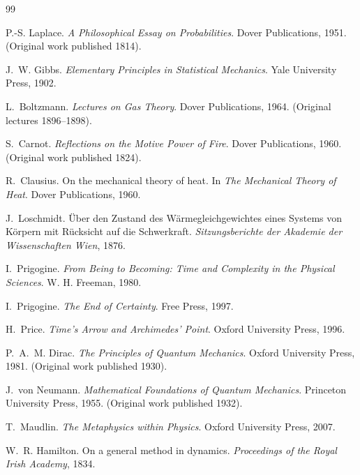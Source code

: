 \documentclass[11pt,oneside]{book}
\begin{document}
\begin{thebibliography}{99}

P.-S. Laplace.
\newblock \emph{A Philosophical Essay on Probabilities}.
\newblock Dover Publications, 1951.
\newblock (Original work published 1814).

J.~W. Gibbs.
\newblock \emph{Elementary Principles in Statistical Mechanics}.
\newblock Yale University Press, 1902.

L.~Boltzmann.
\newblock \emph{Lectures on Gas Theory}.
\newblock Dover Publications, 1964.
\newblock (Original lectures 1896--1898).

S.~Carnot.
\newblock \emph{Reflections on the Motive Power of Fire}.
\newblock Dover Publications, 1960.
\newblock (Original work published 1824).

R.~Clausius.
\newblock On the mechanical theory of heat.
\newblock In \emph{The Mechanical Theory of Heat}.
\newblock Dover Publications, 1960.

J.~Loschmidt.
\newblock \"Uber den Zustand des W\"armegleichgewichtes eines Systems von
K\"orpern mit R\"ucksicht auf die Schwerkraft.
\newblock \emph{Sitzungsberichte der Akademie der Wissenschaften Wien}, 1876.

I.~Prigogine.
\newblock \emph{From Being to Becoming: Time and Complexity in the Physical
Sciences}.
\newblock W. H. Freeman, 1980.

I.~Prigogine.
\newblock \emph{The End of Certainty}.
\newblock Free Press, 1997.

H.~Price.
\newblock \emph{Time’s Arrow and Archimedes’ Point}.
\newblock Oxford University Press, 1996.

P.~A.~M. Dirac.
\newblock \emph{The Principles of Quantum Mechanics}.
\newblock Oxford University Press, 1981.
\newblock (Original work published 1930).

J.~von Neumann.
\newblock \emph{Mathematical Foundations of Quantum Mechanics}.
\newblock Princeton University Press, 1955.
\newblock (Original work published 1932).

T.~Maudlin.
\newblock \emph{The Metaphysics within Physics}.
\newblock Oxford University Press, 2007.

W.~R. Hamilton.
\newblock On a general method in dynamics.
\newblock \emph{Proceedings of the Royal Irish Academy}, 1834.


\end{thebibliography}
\end{document}
